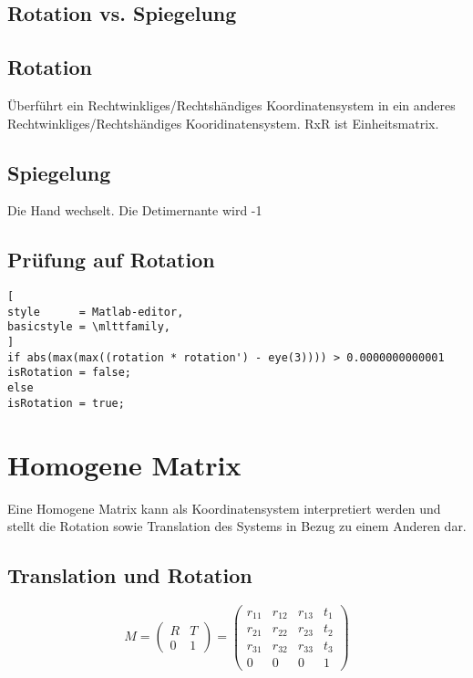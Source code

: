 \subsection{Rotation vs. Spiegelung}

	\subsection{Rotation}
 		Überführt ein Rechtwinkliges/Rechtshändiges Koordinatensystem in ein anderes Rechtwinkliges/Rechtshändiges Kooridinatensystem. RxR ist Einheitsmatrix.
 	\subsection{Spiegelung}
		Die Hand wechselt. Die Detimernante wird -1

\subsection{Prüfung auf Rotation}

\begin{lstlisting}[
style      = Matlab-editor,
basicstyle = \mlttfamily,
]
if abs(max(max((rotation * rotation') - eye(3)))) > 0.0000000000001
isRotation = false;
else
isRotation = true;

\end{lstlisting}


\section{Homogene Matrix}
\label{chp:MathematischeGrundlagen:sec:HomogeneMatrix}

Eine Homogene Matrix kann als Koordinatensystem interpretiert werden und stellt die Rotation sowie Translation des Systems in Bezug zu einem Anderen dar.

\subsection{Translation und Rotation}
\begin{equation}
	M = 
	\left(
	\begin{array}{cc}
		R & T\\
		0 & 1
	\end{array}
	\right)
	=
	\left(
	\begin{array}{cccc}
		r_{11} & r_{12} & r_{13} & t_{1} \\
		r_{21} & r_{22} & r_{23} & t_{2} \\
		r_{31} & r_{32} & r_{33} & t_{3} \\
		0 	   & 0    & 0    & 1  
	\end{array}
	\right)	
\end{equation}

